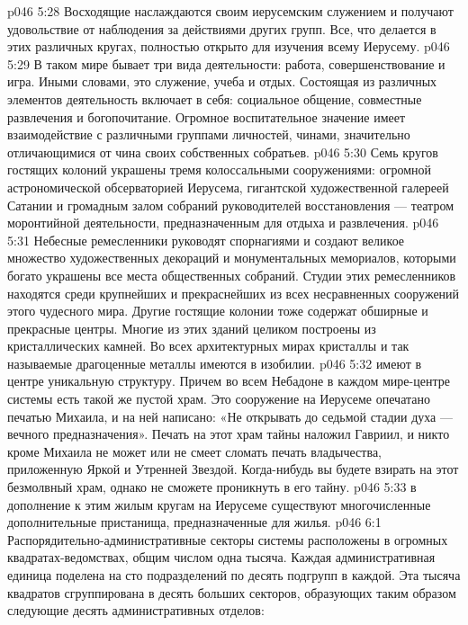 \vs p046 5:28 Восходящие наслаждаются своим иерусемским служением и получают удовольствие от наблюдения за действиями других групп. Все, что делается в этих различных кругах, полностью открыто для изучения всему Иерусему.
\vs p046 5:29 В таком мире бывает три вида деятельности: работа, совершенствование и игра. Иными словами, это служение, учеба и отдых. Состоящая из различных элементов деятельность включает в себя: социальное общение, совместные развлечения и богопочитание. Огромное воспитательное значение имеет взаимодействие с различными группами личностей, чинами, значительно отличающимися от чина своих собственных собратьев.
\vs p046 5:30 \pc {}\bibnobreakspace {} Семь кругов гостящих колоний украшены тремя колоссальными сооружениями: огромной астрономической обсерваторией Иерусема, гигантской художественной галереей Сатании и громадным залом собраний руководителей восстановления --- театром моронтийной деятельности, предназначенным для отдыха и развлечения.
\vs p046 5:31 Небесные ремесленники руководят спорнагиями и создают великое множество художественных декораций и монументальных мемориалов, которыми богато украшены все места общественных собраний. Студии этих ремесленников находятся среди крупнейших и прекраснейших из всех несравненных сооружений этого чудесного мира. Другие гостящие колонии тоже содержат обширные и прекрасные центры. Многие из этих зданий целиком построены из кристаллических камней. Во всех архитектурных мирах кристаллы и так называемые драгоценные металлы имеются в изобилии.
\vs p046 5:32 \pc {}\bibnobreakspace {} имеют в центре уникальную структуру. Причем во всем Небадоне в каждом мире\hyp{}центре системы есть такой же пустой храм. Это сооружение на Иерусеме опечатано печатью Михаила, и на ней написано: «Не открывать до седьмой стадии духа --- вечного предназначения». Печать на этот храм тайны наложил Гавриил, и никто кроме Михаила не может или не смеет сломать печать владычества, приложенную Яркой и Утренней Звездой. Когда\hyp{}нибудь вы будете взирать на этот безмолвный храм, однако не сможете проникнуть в его тайну.
\vs p046 5:33 \pc {} в дополнение к этим жилым кругам на Иерусеме существуют многочисленные дополнительные пристанища, предназначенные для жилья.
\vs p046 6:1 Распорядительно\hyp{}административные секторы системы расположены в огромных квадратах\hyp{}ведомствах, общим числом одна тысяча. Каждая административная единица поделена на сто подразделений по десять подгрупп в каждой. Эта тысяча квадратов сгруппирована в десять больших секторов, образующих таким образом следующие десять административных отделов:
